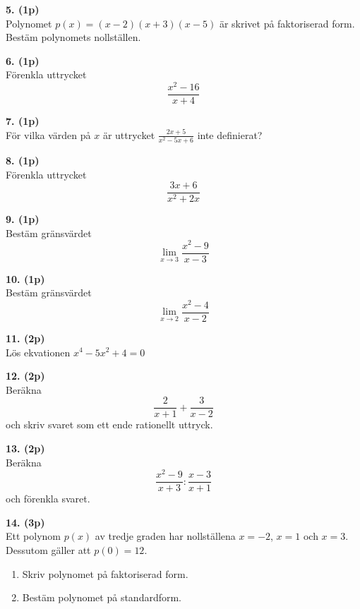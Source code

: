 \documentclass[12pt]{article}
\begin{document}
\noindent
\textbf{5. (1p)} \\
Polynomet $p(x) = (x - 2)(x + 3)(x - 5)$ är skrivet på faktoriserad form. Bestäm polynomets nollställen.

\vspace{0.5cm}

\noindent
\textbf{6. (1p)} \\
Förenkla uttrycket
\[
 \frac{x^2 - 16}{x + 4}
\]

\vspace{0.5cm}

\noindent
\textbf{7. (1p)} \\
För vilka värden på $x$ är uttrycket $\displaystyle \frac{2x + 5}{x^2 - 5x + 6}$ inte definierat?

\vspace{0.5cm}
\newpage
\noindent
\textbf{8. (1p)} \\
Förenkla uttrycket
\[
 \frac{3x + 6}{x^2 + 2x}
\]

\vspace{0.5cm}

\noindent
\textbf{9. (1p)} \\
Bestäm gränsvärdet
\[
 \lim_{x \to 3} \frac{x^2 - 9}{x - 3}
\]

\vspace{0.5cm}

\noindent
\textbf{10. (1p)} \\
Bestäm gränsvärdet
\[
 \lim_{x \to 2} \frac{x^2 - 4}{x - 2}
\]

\noindent
\textbf{11. (2p)} \\
Lös ekvationen $x^4 - 5x^2 + 4 = 0$

\vspace{0.5cm}

\noindent
\textbf{12. (2p)} \\
Beräkna
\[
 \frac{2}{x + 1} + \frac{3}{x - 2}
\]
och skriv svaret som ett ende rationellt uttryck.

\vspace{0.5cm}

\noindent
\textbf{13. (2p)} \\
Beräkna
\[
 \frac{x^2 - 9}{x + 3} : \frac{x - 3}{x + 1}
\]
och förenkla svaret.

\vspace{0.5cm}

\noindent
\textbf{14. (3p)} \\
Ett polynom $p(x)$ av tredje graden har nollställena $x = -2$, $x = 1$ och $x = 3$. Dessutom gäller att $p(0) = 12$.
\begin{enumerate}[label=\alph*)]
    \item Skriv polynomet på faktoriserad form.
    \item Bestäm polynomet på standardform.
\end{enumerate}
\end{document}

